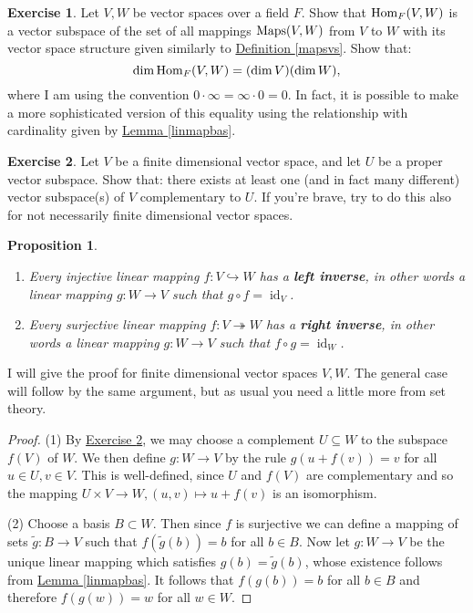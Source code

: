 \documentclass[11pt]{amsbook}
\DeclareMathOperator{\id}{\mathrm{id}}
\newtheorem{proposition}[theorem]{Proposition}
\theoremstyle{definition}
\newtheorem{exercise}{Exercise}
\begin{document}
\begin{exercise} \label{linmapvs} Let $V,W$ be vector spaces over a field $F$. Show that ${\rm Hom}_F(V,W)$ is a vector subspace of the set of all mappings ${\rm Maps}(V,W)$ from $V$ to $W$ with its vector space structure given similarly to \hyperref[mapsvs]{Definition \ref{mapsvs}}. Show that: $$\dim {\rm Hom}_F(V,W) = (\dim V)(\dim W),$$ where I am using the convention $0\cdot \infty = \infty \cdot 0 = 0.$ In fact, it is possible to make a more sophisticated version of this equality using the relationship with cardinality given by \hyperref[linmapbas]{Lemma \ref{linmapbas}}.\end{exercise}

\begin{exercise} \label{existenceofcomplements} Let $V$ be a finite dimensional vector space, and let $U$ be a proper vector subspace. Show that: there exists at least one (and in fact many different) vector subspace(s) of $V$ complementary to $U$. If you're brave, try to do this also for not necessarily finite dimensional vector spaces. \end{exercise}

\begin{proposition} \begin{enumerate} \item Every injective linear mapping $f: V\hookrightarrow W$ has a {\bf left inverse}, in other words a linear mapping $g:W \to V$ such that $g\circ f = \id_V$.
\item Every surjective linear mapping $f:V \twoheadrightarrow W$ has a {\bf right inverse}, in other words a linear mapping $g:W \to V$ such that $f\circ g = \id_W$.
\end{enumerate}
\end{proposition}
 I will give the proof for finite dimensional vector spaces $V,W$. The general case will follow by the same argument, but as usual you need a little more from set theory.
\begin{proof}
(1) By \hyperref[existenceofcomplements]{Exercise \ref{existenceofcomplements}}, we may choose a complement $U\subseteq W$ to the subspace $f(V)$ of $W$. We then define $g:W\to V$ by the rule $g(u+f(v)) = v$ for all $u\in U, v\in V$. This is well-defined, since $U$ and $f(V)$ are complementary and so the mapping $U\times V \to W, (u,v) \mapsto u+f(v)$ is an isomorphism.

(2) Choose a basis $B \subset W$. Then since $f$ is surjective we can define a mapping of sets $\tilde{g}: B\to V$ such that $f(\tilde{g}(b)) = b$ for all $b\in B$. Now let $g: W\to V$ be the unique linear mapping which satisfies $g(b) = \tilde{g}(b)$, whose existence follows from \hyperref[linmapbas]{Lemma \ref{linmapbas}}. It follows that $f(g(b)) = b$ for all $b\in B$ and therefore $f(g(w)) = w$ for all $w\in W$.
\end{proof}
\end{document}
